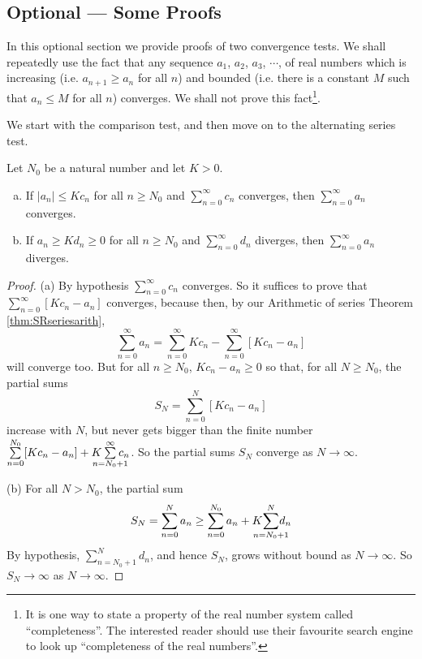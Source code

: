 \subsection{Optional --- Some Proofs}\label{sec:CompProof}

In this optional section we provide proofs of two convergence tests.
We shall repeatedly use the fact that any sequence $a_1$, $a_2$, $a_3$,
$\cdots$, of real numbers which is increasing
(i.e. $a_{n+1}\ge a_n$ for all $n$) and bounded (i.e. there is a constant $M$
such that $a_n\le M$ for all $n$) converges. We shall not prove this
fact\footnote{It is one way to state a property of the real number system
called ``completeness''. The interested reader should use their
favourite search engine to look up ``completeness of the real numbers''.}.

We start with the comparison test, and then move on to the
alternating series test.
\begingroup
\def\thetheorem{\ref{thm:SRcomparisonTest}}
\begin{theorem}
Let $N_0$ be a natural number and let $K>0$.
\begin{enumerate}[(a)]
\item If $|a_n|\le K c_n$ for all $n\ge N_0$ and
$\sum\limits_{n=0}^\infty c_n$ converges, then
$\sum\limits_{n=0}^\infty a_n$ converges.
\item If $a_n\ge K d_n\ge0 $ for all $n\ge N_0$ and
$\sum\limits_{n=0}^\infty d_n$ diverges, then
$\sum\limits_{n=0}^\infty a_n$ diverges.
\end{enumerate}
\end{theorem}
\addtocounter{theorem}{-1}
\endgroup

\begin{proof}
(a) By hypothesis $\sum_{n=0}^\infty c_n$ converges.
So it suffices to prove that $\sum_{n=0}^\infty [Kc_n-a_n]$
converges, because then, by our Arithmetic of series
Theorem \ref{thm:SRseriesarith},
\begin{equation*}
\sum_{n=0}^\infty a_n
    = \sum_{n=0}^\infty K c_n
    -\sum_{n=0}^\infty [Kc_n-a_n]
\end{equation*}
will converge too. But for all $n\ge N_0$, $Kc_n-a_n\ge 0$ so that,
for all $N\ge N_0$, the partial sums
\begin{equation*}
S_N = \sum_{n=0}^N [Kc_n-a_n]
\end{equation*}
increase with $N$, but never gets bigger than the finite number
$\sum\limits_{n=0}^{N_0} [Kc_n-a_n]
+ K\hskip-10pt\sum\limits_{n=N_0+1}^\infty\hskip-10pt c_n$.
So the partial sums $S_N$ converge as $N\rightarrow\infty$.

\medskip
\noindent (b) For all $N> N_0$, the partial sum
\begin{equation*}
S_N = \sum_{n=0}^N a_n
    \ge \sum_{n=0}^{N_0} a_n + K\hskip-10pt\sum_{n=N_0+1}^N\hskip-10pt d_n
\end{equation*}
By hypothesis, $\sum_{n=N_0+1}^N d_n$, and hence $S_N$, grows without bound as
$N\rightarrow\infty$. So $S_N\rightarrow\infty$  as $N\rightarrow\infty$.
\end{proof}


